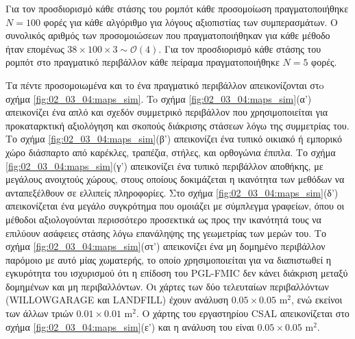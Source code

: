 Για τον προσδιορισμό κάθε στάσης του ρομπότ κάθε προσομοίωση πραγματοποιήθηκε
$N = 100$ φορές για κάθε αλγόριθμο για λόγους αξιοπιστίας των συμπερασμάτων. Ο
συνολικός αριθμός των προσομοιώσεων που πραγματοποιήθηκαν για κάθε μέθοδο ήταν
επομένως $ 38 \times 100 \times 3 \sim \mathcal{O}(4)$.  Για τον προσδιορισμό
κάθε στάσης του ρομπότ στο πραγματικό περιβάλλον κάθε πείραμα πραγματοποιήθηκε
$N = 5$ φορές.

Τα πέντε προσομοιωμένα και το ένα πραγματικό περιβάλλον απεικονίζονται στo
σχήμα \ref{fig:02_03_04:maps_sim}. To σχήμα \ref{fig:02_03_04:maps_sim}(α')
απεικονίζει ένα απλό και σχεδόν συμμετρικό περιβάλλον που χρησιμοποιείται για
προκαταρκτική αξιολόγηση και σκοπούς διάκρισης στάσεων λόγω της συμμετρίας του.
Το σχήμα \ref{fig:02_03_04:maps_sim}(β') απεικονίζει ένα τυπικό οικιακό ή
εμπορικό χώρο διάσπαρτο από καρέκλες, τραπέζια, στήλες, και ορθογώνια έπιπλα.
Το σχήμα \ref{fig:02_03_04:maps_sim}(γ') απεικονίζει ένα τυπικό περιβάλλον
αποθήκης, με μεγάλους ανοιχτούς χώρους, στους οποίους δοκιμάζεται η ικανότητα
των μεθόδων να ανταπεξέλθουν σε ελλιπείς πληροφορίες. Στο σχήμα
\ref{fig:02_03_04:maps_sim}(δ') απεικονίζεται ένα μεγάλο συγκρότημα που
ομοιάζει με σύμπλεγμα γραφείων, όπου οι μέθοδοι αξιολογούνται περισσότερο
προσεκτικά ως προς την ικανότητά τους να επιλύουν ασάφειες στάσης λόγω
επανάληψης της γεωμετρίας των μερών του. Το σχήμα
\ref{fig:02_03_04:maps_sim}(στ') απεικονίζει ένα μη δομημένο περιβάλλον
παρόμοιο με αυτό μίας χωματερής, το οποίο χρησιμοποιείται για να διαπιστωθεί η
εγκυρότητα του ισχυρισμού ότι η επίδοση του PGL-FMIC δεν κάνει διάκριση μεταξύ
δομημένων και μη περιβαλλόντων. Οι χάρτες των δύο τελευταίων περιβαλλόντων
(WILLOWGARAGE και LANDFILL) έχουν ανάλυση $0.05\times0.05$ m$^2$, ενώ εκείνοι
των άλλων τριών $0.01\times0.01$ m$^2$. Ο χάρτης του εργαστηρίου CSAL
απεικονίζεται στο σχήμα \ref{fig:02_03_04:maps_sim}(ε') και η ανάλυση του είναι
$0.05\times0.05$ m$^2$.

